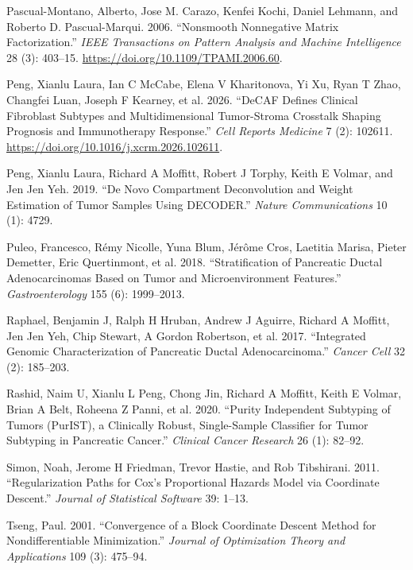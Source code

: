 \documentclass[
]{article}
\newlength{\cslhangindent}
\newenvironment{CSLReferences}[2] %
 {\begin{list}{}{%
  \setlength{\itemindent}{0pt}
  \setlength{\leftmargin}{0pt}
  \setlength{\parsep}{0pt}
  \ifodd #1
   \setlength{\leftmargin}{\cslhangindent}
   \setlength{\itemindent}{-1\cslhangindent}
  \fi
  \setlength{\itemsep}{#2\baselineskip}}}
 {\end{list}}
\begin{document}
\begin{CSLReferences}{1}{0}
Pascual-Montano, Alberto, Jose M. Carazo, Kenfei Kochi, Daniel Lehmann,
and Roberto D. Pascual-Marqui. 2006. {``Nonsmooth Nonnegative Matrix
Factorization.''} \emph{IEEE Transactions on Pattern Analysis and
Machine Intelligence} 28 (3): 403--15.
\url{https://doi.org/10.1109/TPAMI.2006.60}.

Peng, Xianlu Laura, Ian C McCabe, Elena V Kharitonova, Yi Xu, Ryan T
Zhao, Changfei Luan, Joseph F Kearney, et al. 2026. {``DeCAF Defines
Clinical Fibroblast Subtypes and Multidimensional Tumor-Stroma Crosstalk
Shaping Prognosis and Immunotherapy Response.''} \emph{Cell Reports
Medicine} 7 (2): 102611.
\url{https://doi.org/10.1016/j.xcrm.2026.102611}.

Peng, Xianlu Laura, Richard A Moffitt, Robert J Torphy, Keith E Volmar,
and Jen Jen Yeh. 2019. {``De Novo Compartment Deconvolution and Weight
Estimation of Tumor Samples Using DECODER.''} \emph{Nature
Communications} 10 (1): 4729.

Puleo, Francesco, Rémy Nicolle, Yuna Blum, Jérôme Cros, Laetitia Marisa,
Pieter Demetter, Eric Quertinmont, et al. 2018. {``Stratification of
Pancreatic Ductal Adenocarcinomas Based on Tumor and Microenvironment
Features.''} \emph{Gastroenterology} 155 (6): 1999--2013.

Raphael, Benjamin J, Ralph H Hruban, Andrew J Aguirre, Richard A
Moffitt, Jen Jen Yeh, Chip Stewart, A Gordon Robertson, et al. 2017.
{``Integrated Genomic Characterization of Pancreatic Ductal
Adenocarcinoma.''} \emph{Cancer Cell} 32 (2): 185--203.

Rashid, Naim U, Xianlu L Peng, Chong Jin, Richard A Moffitt, Keith E
Volmar, Brian A Belt, Roheena Z Panni, et al. 2020. {``Purity
Independent Subtyping of Tumors (PurIST), a Clinically Robust,
Single-Sample Classifier for Tumor Subtyping in Pancreatic Cancer.''}
\emph{Clinical Cancer Research} 26 (1): 82--92.

Simon, Noah, Jerome H Friedman, Trevor Hastie, and Rob Tibshirani. 2011.
{``Regularization Paths for Cox's Proportional Hazards Model via
Coordinate Descent.''} \emph{Journal of Statistical Software} 39: 1--13.

Tseng, Paul. 2001. {``Convergence of a Block Coordinate Descent Method
for Nondifferentiable Minimization.''} \emph{Journal of Optimization
Theory and Applications} 109 (3): 475--94.


\end{CSLReferences}
\end{document}
